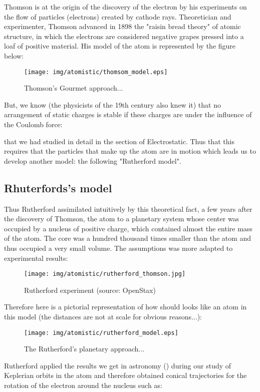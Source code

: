 Thomson is at the origin of the discovery of the electron by his experiments on the flow of particles (electrons) created by cathode rays. Theoretician and experimenter, Thomson advanced in 1898 the "raisin bread theory" of atomic structure, in which the electrons are considered negative grapes pressed into a loaf of positive material. His model of the atom is represented by the figure below:

\begin{figure}[H]
\centering
\texttt{[image: img/atomistic/thomsom\_model.eps]}
\caption{Thomson's Gourmet approach...}
\end{figure}

But, we know (the physicists of the 19th century also knew it) that no arrangement of static charges is stable if these charges are under the influence of the Coulomb force:
	
that we had studied in detail in the section of Electrostatic. Thus that this requires that the particles that make up the atom are in motion which leads us to develop another model: the following "Rutherford model".

\subsection{Rhuterfords's model}\label{rhuterford model}

Thus Rutherford assimilated intuitively by this theoretical fact, a few years after the discovery of Thomson, the atom to a planetary system whose center was occupied by a nucleus of positive charge, which contained almost the entire mass of the atom. The core was a hundred thousand times smaller than the atom and thus occupied a very small volume. The assumptions was more adapted to experimental results:
	\begin{figure}[H]
		\centering
		\texttt{[image: img/atomistic/rutherford\_thomson.jpg]}	
		\caption[Rutherford experiment]{Rutherford experiment (source: OpenStax)}
	\end{figure}
Therefore here is a pictorial representation of how should looks like an atom in this model (the distances are not at scale for obvious reasons...):

\begin{figure}[H]
\centering
\texttt{[image: img/atomistic/rutherford\_model.eps]}
\caption{The Rutherford's planetary approach...}
\end{figure}

Rutherford applied the results we get in astronomy () during our study of Keplerian orbits in the atom and therefore obtained conical trajectories for the rotation of the electron around the nucleus such as:
	
